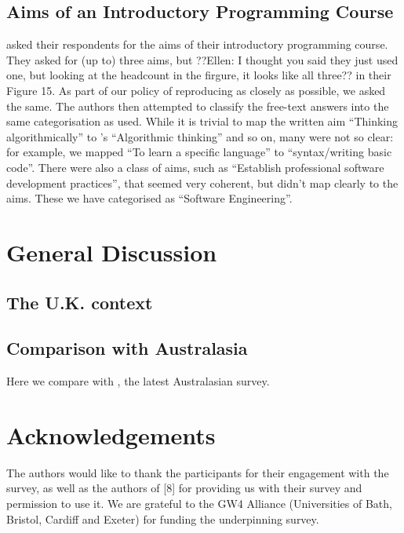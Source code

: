 \documentclass{sig-alternate}
\begin{document}
\subsection{Aims of an Introductory Programming Course}
 \cite{mason+cooper:2014} asked their respondents for the aims of their introductory programming course. They asked for (up to) three aims, but ??Ellen: I thought you said they just used one, but looking at the headcount in the firgure, it looks like all three?? in their Figure 15. As part of our policy of reproducing  \cite{mason+cooper:2014} as closely as possible, we asked the same. The authors then attempted to classify the free-text answers into the same categorisation as  \cite{mason+cooper:2014} used. While it is trivial to map the written aim ``Thinking algorithmically'' to \cite{mason+cooper:2014}'s ``Algorithmic thinking'' and so on, many were not so clear: for example, we mapped ``To learn a specific language'' to ``syntax/writing basic code''. There were also a class of aims, such as ``Establish professional software development practices'', that seemed very coherent, but didn't map clearly to the \cite{mason+cooper:2014} aims. These we have categorised as ``Software Engineering''.

\section{General Discussion}\label{discussion}

\subsection{The U.K. context}

\subsection{Comparison with Australasia}
Here we compare with \cite{mason+cooper:2014}, the latest Australasian survey.


\section{Acknowledgements}

The authors would like to thank the participants for their engagement
with the survey, as well as the authors of [8] for providing us with their survey and permission to use it.
We are grateful to the GW4 Alliance (Universities of Bath, Bristol, Cardiff and Exeter) for funding the underpinning survey.


\end{document}
